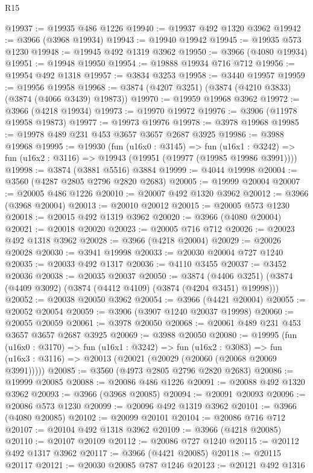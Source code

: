 \begin{lexlean}{R15}
\begin{coremodule}
@19937 := @19935 @486 @1226
@19940 := @19937 @492 @1320 @3962
@19942 := @3966 (@3968 @19934)
@19943 := @19940 @19942
@19945 := @19935 @573 @1230
@19948 := @19945 @492 @1319 @3962
@19950 := @3966 (@4080 @19934)
@19951 := @19948 @19950
@19954 := @19888 @19934 @716 @712
@19956 := @19954 @492 @1318
@19957 := @3834 @3253
@19958 := @3440 @19957
@19959 := @19956 @19958
@19968 := @3874 (@4207 @3251) (@3874 (@4210 @3833) (@3874 (@4066 @3439) @19873))
@19970 := @19959 @19968 @3962
@19972 := @3966 (@4218 @19934)
@19973 := @19970 @19972
@19976 := @3906 (@11978 @19958 @19873)
@19977 := @19973 @19976
@19978 := @3978 @19968
@19985 := @19978 @489 @231 @453 @3657 @3657 @2687 @3925
@19986 := @3988 @19968
@19995 := @19930
    (fun (u16x0 : @3145) =>
    fun (u16x1 : @3242) => fun (u16x2 : @3116) => @19943 (@19951 (@19977 (@19985 @19986 @3991))))
@19998 := @3874 (@3881 @5516) @3884
@19999 := @4044 @19998
@20004 := @3560 (@4287 @2805 @2796 @2820 @2683)
@20005 := @19999 @20004
@20007 := @20005 @486 @1226
@20010 := @20007 @492 @1320 @3962
@20012 := @3966 (@3968 @20004)
@20013 := @20010 @20012
@20015 := @20005 @573 @1230
@20018 := @20015 @492 @1319 @3962
@20020 := @3966 (@4080 @20004)
@20021 := @20018 @20020
@20023 := @20005 @716 @712
@20026 := @20023 @492 @1318 @3962
@20028 := @3966 (@4218 @20004)
@20029 := @20026 @20028
@20030 := @3941 @19998
@20033 := @20030 @20004 @727 @1240
@20035 := @20033 @492 @1317
@20036 := @4110 @3455
@20037 := @3452 @20036
@20038 := @20035 @20037
@20050 := @3874
    (@4406 @3251)
    (@3874 (@4409 @3092) (@3874 (@4412 @4109) (@3874 (@4204 @3451) @19998)))
@20052 := @20038 @20050 @3962
@20054 := @3966 (@4421 @20004)
@20055 := @20052 @20054
@20059 := @3906 (@3907 @1240 @20037 @19998)
@20060 := @20055 @20059
@20061 := @3978 @20050
@20068 := @20061 @489 @231 @453 @3657 @3657 @2687 @3925
@20069 := @3988 @20050
@20080 := @19995
    (fun (u16x0 : @3170) =>
    fun (u16x1 : @3242) =>
    fun (u16x2 : @3083) =>
    fun (u16x3 : @3116) => @20013 (@20021 (@20029 (@20060 (@20068 @20069 @3991)))))
@20085 := @3560 (@4973 @2805 @2796 @2820 @2683)
@20086 := @19999 @20085
@20088 := @20086 @486 @1226
@20091 := @20088 @492 @1320 @3962
@20093 := @3966 (@3968 @20085)
@20094 := @20091 @20093
@20096 := @20086 @573 @1230
@20099 := @20096 @492 @1319 @3962
@20101 := @3966 (@4080 @20085)
@20102 := @20099 @20101
@20104 := @20086 @716 @712
@20107 := @20104 @492 @1318 @3962
@20109 := @3966 (@4218 @20085)
@20110 := @20107 @20109
@20112 := @20086 @727 @1240
@20115 := @20112 @492 @1317 @3962
@20117 := @3966 (@4421 @20085)
@20118 := @20115 @20117
@20121 := @20030 @20085 @787 @1246
@20123 := @20121 @492 @1316

\end{coremodule}
\end{lexlean}
